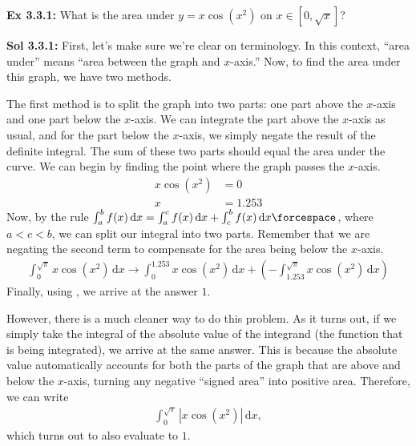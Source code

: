 \begin{tcolorbox}[example]
    \textbf{Ex 3.3.1: } What is the area under $y = x\cos \left(x^2\right)$ on $x \in \left[0, \sqrt{x}\right]$?
\end{tcolorbox}
\begin{tcolorbox}[solution]
    \textbf{Sol 3.3.1: } First, let's make sure we're clear on terminology. In this context, ``area under'' means ``area between the graph and $x$-axis.'' Now, to find the area under this graph, we have two methods. \par
    \vspace{11pt}
    The first method is to split the graph into two parts: one part above the $x$-axis and one part below the $x$-axis. We can integrate the part above the $x$-axis as usual, and for the part below the $x$-axis, we simply negate the result of the definite integral. The sum of these two parts should equal the area under the curve. We can begin by finding the point where the graph passes the $x$-axis. \begin{align*}
        x\cos \left(x^2\right) &= 0 \\[11pt]
        x &= 1.253
    \end{align*}
    Now, by the rule $\int_a^b f(x) \,\mathrm{d}x = \int_a^c f(x) \,\mathrm{d}x + \int_c^b f(x) \,\mathrm{d}x \forcespace$, where $a < c < b$, we can split our integral into two parts. Remember that we are negating the second term to compensate for the area being below the $x$-axis. \begin{align*}
        \int_0^{\sqrt{\pi}} x\cos \left(x^2\right) \,\mathrm{d}x \rightarrow \int_0^{1.253} x\cos \left(x^2\right) \,\mathrm{d}x + \left(-\int_{1.253}^{\sqrt{\pi}} x\cos \left(x^2\right) \,\mathrm{d}x\right)
    \end{align*}
    Finally, using  , we arrive at the answer $\boxed{1}$. \par
    \vspace{11pt}
    However, there is a much cleaner way to do this problem. As it turns out, if we simply take the integral of the absolute value of the integrand (the function that is being integrated), we arrive at the same answer. This is because the absolute value automatically accounts for both the parts of the graph that are above and below the $x$-axis, turning any negative “signed area” into positive area. Therefore, we can write \begin{align*}
        \int_0^{\sqrt{\pi}} \left|x\cos \left(x^2\right)\right| \,\mathrm{d}x, 
    \end{align*}
    which turns out to also evaluate to $\boxed{1}$.
\end{tcolorbox}

